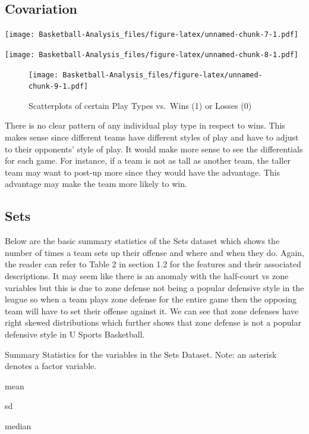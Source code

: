 \documentclass[]{book}
\begin{document}
\hypertarget{covariation}{%
\subsection{Covariation}\label{covariation}}

\texttt{[image: Basketball-Analysis\_files/figure-latex/unnamed-chunk-7-1.pdf]}

\texttt{[image: Basketball-Analysis\_files/figure-latex/unnamed-chunk-8-1.pdf]}

\begin{figure}
\centering
\texttt{[image: Basketball-Analysis\_files/figure-latex/unnamed-chunk-9-1.pdf]}
\caption{\label{fig:unnamed-chunk-9}Scatterplots of certain Play Types vs.~Wins (1) or Losses (0)}
\end{figure}

There is no clear pattern of any individual play type in respect to wins. This makes sense since different teams have different styles of play and have to adjust to their opponents' style of play. It would make more sense to see the differentials for each game. For instance, if a team is not as tall as another team, the taller team may want to post-up more since they would have the advantage. This advantage may make the team more likely to win.

\hypertarget{sets-1}{%
\subsection{Sets}\label{sets-1}}

Below are the basic summary statistics of the Sets dataset which shows the number of times a team sets up their offense and where and when they do. Again, the reader can refer to Table 2 in section 1.2 for the features and their associated descriptions.
It may seem like there is an anomaly with the half-court vs zone variables but this is due to zone defense not being a popular defensive style in the league so when a team plays zone defense for the entire game then the opposing team will have to set their offense against it.
We can see that zone defenses have right skewed distributions which further shows that zone defense is not a popular defensive style in U Sports Basketball.

\label{tab:unnamed-chunk-12}Summary Statistics for the variables in the Sets Dataset. Note: an asterisk denotes a factor variable.

mean

sd

median
\end{document}
